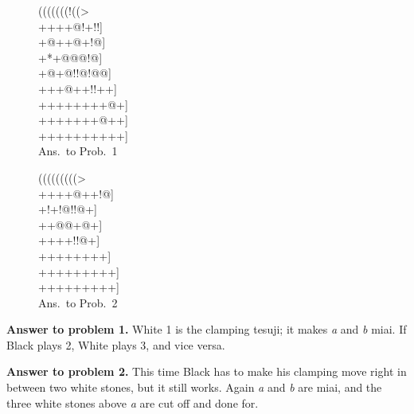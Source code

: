 \documentclass[mcrownvopaper,10pt,twopage,onecolumn,final]{memoir}
\begin{document}
\begin{figure}[ht]
    \begin{minipage}[c]{0.50\linewidth}
        \centering    
        {\gnos%
        (((((((!((>\\
        ++++{\gnosw{}}@!+!!]\\
        +@++{\gnosw{}}{\gnosb{}}@+!@]\\
        +*+@@@!@]\\
        +@+@!!@!@@]\\
        +++@++!!++]\\
        ++++++++@+]\\
        +++++++@++]\\
        ++++++++++]\\
        }
        Ans.\ to Prob.\ 1
    \end{minipage}%
    \begin{minipage}[c]{0.50\linewidth}
        \centering    
                {\gnos%
        (((((((((>\\
        ++++@++!@]\\
        +!+!@!!@+]\\
        ++@@+@+]\\
        ++++!{\gnosb{}}!@+]\\
        ++++++++]\\
        +++++++++]\\
        +++++++++]\\
        }
        Ans.\ to Prob.\ 2
    \end{minipage}%
\end{figure}  
\noindent
\textbf{Answer to problem 1.} White 1 is the clamping tesuji; it makes \textit{a} and \textit{b}
miai. If Black plays 2, White plays 3, and vice versa.

\noindent
\textbf{Answer to problem 2.} This time Black has to make his clamping move
right in between two white stones, but it still works. Again \textit{a} and \textit{b} are
miai, and the three white stones above \textit{a} are cut off and done for.
\end{document}
